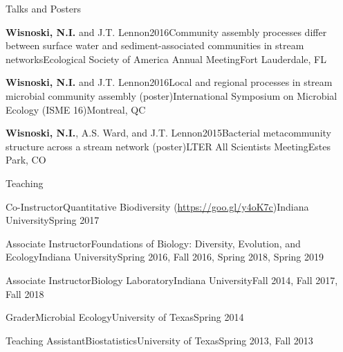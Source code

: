 \documentclass{resume} %
\begin{document}
\begin{rhangSection}{Talks and Posters}
  \begin{Presentation}{{\bf Wisnoski, N.I.} and J.T. Lennon}{2016}{Community assembly processes differ between surface water and sediment-associated communities in stream networks}{Ecological Society of America Annual Meeting}{Fort Lauderdale, FL}
  \end{Presentation}

  \begin{Presentation}{{\bf Wisnoski, N.I.} and J.T. Lennon}{2016}{Local and regional processes in stream microbial community assembly (poster)}{International Symposium on Microbial Ecology (ISME 16)}{Montreal, QC}
  \end{Presentation}

  \begin{Presentation}{{\bf Wisnoski, N.I.}, A.S. Ward, and J.T. Lennon}{2015}{Bacterial metacommunity structure across a stream network (poster)}{LTER All Scientists Meeting}{Estes Park, CO}
  \end{Presentation}

\end{rhangSection}

\bigskip

\begin{rSection}{Teaching}

\begin{Course}
  {Co-Instructor}{Quantitative Biodiversity (\url{https://goo.gl/y4oK7c})}{Indiana University}{Spring 2017}
\end{Course}

\begin{Course}
  {Associate Instructor}{Foundations of Biology: Diversity, Evolution, and Ecology}{Indiana University}{Spring 2016, Fall 2016, Spring 2018, Spring 2019}
\end{Course}

\begin{Course}
  {Associate Instructor}{Biology Laboratory}{Indiana University}{Fall 2014, Fall 2017, Fall 2018}
\end{Course}

\begin{Course}
  {Grader}{Microbial Ecology}{University of Texas}{Spring 2014}
\end{Course}

\begin{Course}
  {Teaching Assistant}{Biostatistics}{University of Texas}{Spring 2013, Fall 2013}
\end{Course}

\end{rSection}
\end{document}
